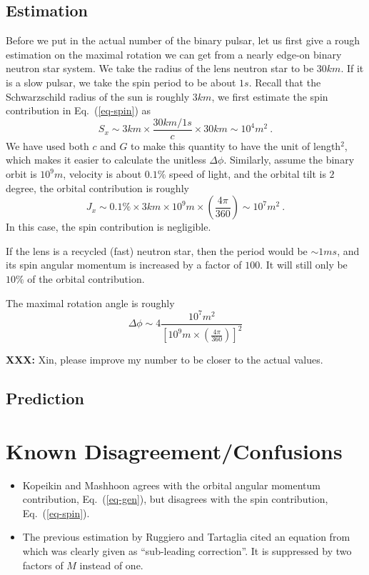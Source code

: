 \documentclass[aps,showpacs,onecolumn,floats,prd,superscriptaddress,nofootinbib]{revtex4}
\begin{document}
\subsection{Estimation}

Before we put in the actual number of the binary pulsar, let us first give a rough estimation on the maximal rotation we can get from a nearly edge-on binary neutron star system.
We take the radius of the lens neutron star to be $30km$.
If it is a slow pulsar, we take the spin period to be about $1s$.
Recall that the Schwarzschild radius of the sun is roughly $3km$, we first estimate the spin contribution in Eq.~(\ref{eq-spin}) as
\begin{equation}
S_x \sim 3km \times \frac{30km/1s}{c} \times 30km \sim 10^4 m^2~.
\end{equation}
We have used both $c$ and $G$ to make this quantity to have the unit of length$^2$, which makes it easier to calculate the unitless $\Delta\phi$.
Similarly, assume the binary orbit is $10^9 m$, velocity is about $0.1\%$ speed of light, and the orbital tilt is $2$ degree, the orbital contribution is roughly
\begin{equation}
J_x \sim 0.1\% \times 3km \times 10^9 m \times\left( \frac{4\pi}{360} \right) \sim 10^7 m^2~.
\end{equation}
In this case, the spin contribution is negligible.

If the lens is a recycled (fast) neutron star, then the period would be $\sim 1ms$, and its spin angular momentum is increased by a factor of $100$.
It will still only be $10\%$ of the orbital contribution.

The maximal rotation angle is roughly
\begin{equation}
\Delta\phi \sim 4 \frac{10^7 m^2}{\left[10^9m\times\left(\frac{4\pi}{360}\right)\right]^2}
\end{equation}

{\bf XXX:} Xin, please improve my number to be closer to the actual values.

\subsection{Prediction}

\section{Known Disagreement/Confusions}

\begin{itemize}
\item Kopeikin and Mashhoon \cite{KopMas01} agrees with the orbital angular momentum contribution, Eq.~(\ref{eq-gen}), but disagrees with the spin contribution, Eq.~(\ref{eq-spin}).
\item The previous estimation by Ruggiero and Tartaglia \cite{RugTar06} cited an equation from \cite{Ser04} which was clearly given as ``sub-leading correction''. It is suppressed by two factors of $M$ instead of one.
\end{itemize}
\end{document}

